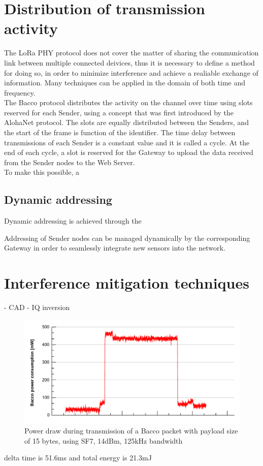 \section{Distribution of transmission activity}
The LoRa PHY protocol does not cover the matter of sharing the communication link between multiple
connected deivices, thus it is necessary to define a method for doing so, in order to minimize interference and achieve
a realiable exchange of information. Many techniques can be applied in the domain of both time and frequency. \\
The Bacco protocol distributes the activity on the channel over time using slots reserved for each Sender, using a
concept that was first introduced by the AlohaNet\cite{alohanet} protocol. The slots are equally distributed between
the Senders, and the start of the frame is function of the identifier. The time delay between transmissions of each Sender is
a constant value and it is called a cycle. At the end of each cycle, a slot is reserved for the Gateway to upload the
data received from the Sender nodes to the Web Server.\\
To make this possible, a 

\subsection{Dynamic addressing}
Dynamic addressing is achieved through the 

Addressing of Sender nodes can be managed dynamically by the corresponding Gateway in order to seamlessly integrate new sensors into the network.

\section{Interference mitigation techniques}
- CAD
- IQ inversion


\begin{figure}[ht]
    \centering
    \includegraphics[width=1.0\textwidth]{images/bacco_SF7_14dbm_125khz_power.pdf}
    \caption{Power draw during transmission of a Bacco packet with payload size of 15 bytes, using SF7, 14dBm, 125kHz bandwidth}
    \label{bacco SF7}
\end{figure}
delta time is 51.6ms and total energy is 21.3mJ

